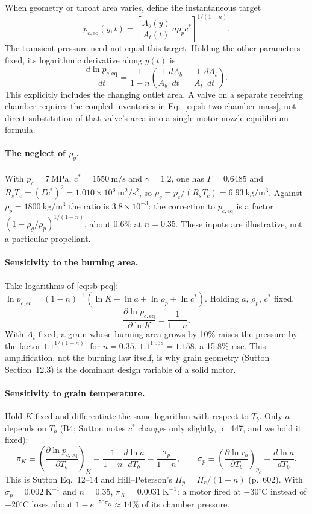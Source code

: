 When geometry or throat area varies, define the instantaneous target
\begin{equation}\label{eq:sb-moving-target}
 p_{c,\mathrm{eq}}(y,t)
 =\left[\frac{A_b(y)}{A_t(t)}\,a\rho_p c^*\right]^{1/(1-n)}.
\end{equation}
The transient pressure need not equal this target. Holding the other
parameters fixed, its logarithmic derivative along $y(t)$ is
\[
 \frac{d\ln p_{c,\mathrm{eq}}}{dt}
 =\frac{1}{1-n}\left(\frac{1}{A_b}\frac{dA_b}{dt}
                    -\frac{1}{A_t}\frac{dA_t}{dt}\right).
\]
This explicitly includes the changing outlet area. A valve on a separate
receiving chamber requires the coupled inventories in
Eq.~\eqref{eq:sb-two-chamber-mass}, not direct substitution of that valve's
area into a single motor-nozzle equilibrium formula.

\paragraph{The neglect of $\rho_g$.} With $p_c=7\ \mathrm{MPa}$,
$c^*=1550\ \mathrm{m/s}$ and $\gamma=1.2$, one has $\Gamma=0.6485$ and
$R_sT_c=(\Gamma c^*)^2=1.010\times10^6\ \mathrm{m^2/s^2}$, so
$\rho_g=p_c/(R_sT_c)=6.93\ \mathrm{kg/m^3}$. Against $\rho_p=1800\ \mathrm{kg/m^3}$
the ratio is $3.8\times10^{-3}$: the correction to $p_{c,\mathrm{eq}}$ is
a factor $(1-\rho_g/\rho_p)^{1/(1-n)}$, about $0.6\%$ at $n=0.35$. These inputs
are illustrative, not a particular propellant.

\paragraph{Sensitivity to the burning area.}
Take logarithms of \eqref{eq:sb-peq}:
$\ln p_{c,\mathrm{eq}}=(1-n)^{-1}(\ln K+\ln a+\ln\rho_p+\ln c^*)$. Holding
$a$, $\rho_p$, $c^*$ fixed,
\[
 \frac{\partial\ln p_{c,\mathrm{eq}}}{\partial\ln K}=\frac{1}{1-n}.
\]
With $A_t$ fixed, a grain whose burning area grows by 10\% raises the pressure by the factor
$1.1^{1/(1-n)}$: for $n=0.35$, $1.1^{1.538}=1.158$, a 15.8\% rise.
This amplification, not the burning law itself, is why grain geometry
(Sutton Section~12.3) is the dominant design variable of a solid motor.

\paragraph{Sensitivity to grain temperature.}
Hold $K$ fixed and differentiate the same logarithm with respect to $T_b$.
Only $a$ depends on $T_b$ (B4; Sutton notes $c^*$ changes only slightly,
p.~447, and we hold it fixed):
\[
 \pi_K\equiv\left(\frac{\partial\ln p_{c,\mathrm{eq}}}{\partial T_b}\right)_K
 =\frac{1}{1-n}\frac{d\ln a}{dT_b}=\frac{\sigma_p}{1-n},
 \qquad
 \sigma_p\equiv\left(\frac{\partial\ln r_b}{\partial T_b}\right)_{p_c}=\frac{d\ln a}{dT_b}.
\]
This is Sutton Eq.~12--14 and Hill--Peterson's $\Pi_p=\Pi_r/(1-n)$
(p.~602). With $\sigma_p=0.002\ \mathrm{K^{-1}}$ and $n=0.35$,
$\pi_K=0.0031\ \mathrm{K^{-1}}$: a motor fired at $-30^\circ$C instead of
$+20^\circ$C loses about $1-e^{-50\pi_K}\approx14\%$ of its chamber pressure.

